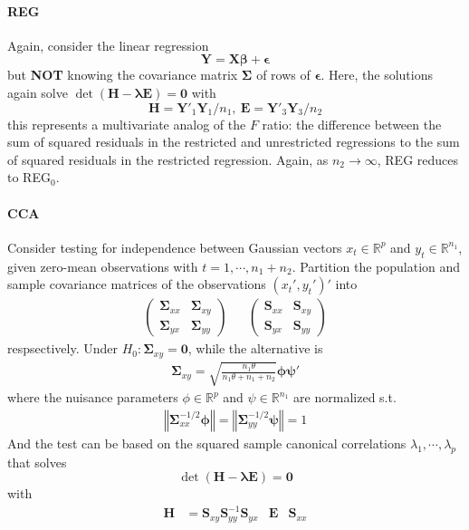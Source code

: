 \documentclass[twoside]{article}
\begin{document}
\paragraph*{REG} Again, consider the linear regression $$ \mathbf{Y} = \mathbf{X}\boldsymbol{\beta} + \boldsymbol{\epsilon} $$ but \textbf{NOT} knowing the covariance matrix $\boldsymbol{\Sigma}$ of rows of $\boldsymbol{\epsilon}$. Here, the solutions again solve $\det \left( \mathbf{H}-\boldsymbol{\lambda }\mathbf{E} \right)=\mathbf{0}$ with $$ \mathbf{H} = \mathbf{Y}'_1\mathbf{Y}_1/n_1,\ \mathbf{E}=\mathbf{Y}'_3\mathbf{Y}_3/n_2 $$
this represents a multivariate analog of the $F$ ratio: the difference between the sum of squared residuals in the restricted and unrestricted regressions to the sum of squared residuals in the restricted regression. Again, as $n_2 \rightarrow \infty$, REG reduces to REG$_0$. 

\paragraph*{CCA} Consider testing for independence between Gaussian vectors $x_t\in\mathbb{R}^p$ and $y_t\in \mathbb{R}^{n_1}$, given zero-mean observations with $t=1,\cdots,n_1+n_2$. Partition the population and sample covariance matrices of the observations $(x_t',y_t')'$ into 
\begin{align*}
    \begin{pmatrix}
        \boldsymbol{\Sigma}_{xx} & \boldsymbol{\Sigma}_{xy}\\
        \boldsymbol{\Sigma}_{yx} & \boldsymbol{\Sigma}_{yy}
    \end{pmatrix} & & \begin{pmatrix}
        \mathbf{S}_{xx} & \mathbf{S}_{xy}\\
        \mathbf{S}_{yx} & \mathbf{S}_{yy}
    \end{pmatrix}
\end{align*}
respsectively. Under $H_0:\boldsymbol{\Sigma}_{xy}=\mathbf{0}$, while the alternative is
\begin{align}
    \boldsymbol{\Sigma}_{xy} = \sqrt{\frac{n_1\theta}{n_1\theta + n_1 + n_2}}\boldsymbol{\phi\psi}'
\end{align}
where the nuisance parameters $\phi \in \mathbb{R}^p$ and $\psi \in \mathbb{R}^{n_1}$ are normalized s.t.
\begin{align*}
    \left\Vert \boldsymbol{\Sigma}_{xx}^{-1/2}\boldsymbol{\phi} \right\Vert = \left\Vert \boldsymbol{\Sigma}_{yy}^{-1/2}\boldsymbol{\psi} \right\Vert = 1
\end{align*}
And the test can be based on the squared sample canonical correlations $\lambda_1,\cdots,\lambda_p$ that solves $$ \det \left( \mathbf{H}-\boldsymbol{\lambda }\mathbf{E} \right)=\mathbf{0} $$
with
\begin{align*}
    \mathbf{H} &= \mathbf{S}_{xy}\mathbf{S}_{yy}^{-1}\mathbf{S}_{yx} & \mathbf{E}&\mathbf{S}_{xx}
\end{align*}
\end{document}
